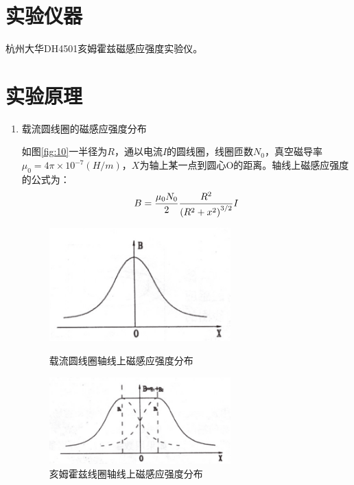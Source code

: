 \documentclass[11pt]{article}
\begin{document}
\section{实验仪器}
    \par 杭州大华DH4501亥姆霍兹磁感应强度实验仪。

\section{实验原理}
\begin{enumerate}
    \item 载流圆线圈的磁感应强度分布
    \par \hspace*{2em}如图\cref{fig:10}一半径为$R$，通以电流$I$的圆线圈，线圈匝数$N_0$，真空磁导率$\mu_0=4\pi\times 10^{-7}(H/m)$，$X$为轴上某一点到圆心O的距离。轴线上磁感应强度的公式为：
    \begin{equation}{\label{equ:6}}
        B=\frac{\mu_0 N_0}{2}\frac{R^2}{\left(R^2+x^2\right)^{3/2}}I
    \end{equation}

    \begin{figure}[!ht]
        \centering
        \begin{minipage}[t]{0.49\linewidth}
            \centering
            \includegraphics[width=7cm]{Fig/10.png}
            \caption{载流圆线圈轴线上磁感应强度分布}
            \label{fig:10}
        \end{minipage}
        \begin{minipage}[t]{0.49\linewidth}
            \centering
            \includegraphics[width=7cm]{Fig/11.png}
            \caption{亥姆霍兹线圈轴线上磁感应强度分布}
            \label{fig:11}
        \end{minipage}
    \end{figure} 


\end{enumerate}
\end{document}
